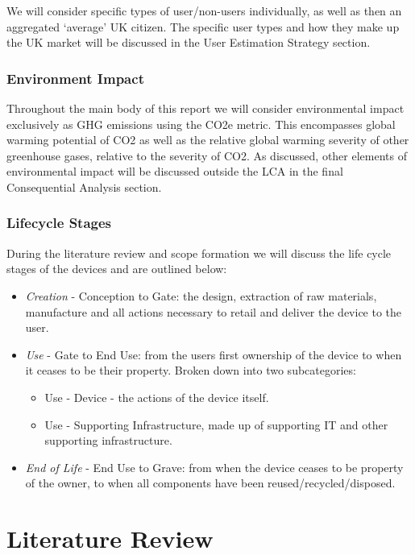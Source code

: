 \documentclass[conference]{IEEEtran}
\begin{document}
We will consider specific types of user/non-users individually, as
well as then an aggregated `average' UK citizen. The specific user
types and how they make up the UK market will be discussed in the User
Estimation Strategy section.

\subsubsection{Environment Impact}

Throughout the main body of this report we will consider environmental
impact exclusively as GHG emissions using the CO2e metric. This
encompasses global warming potential of CO2 as well as the relative
global warming severity of other greenhouse gases, relative to the
severity of CO2. As discussed, other elements of environmental impact
will be discussed outside the LCA in the final Consequential Analysis
section.

\subsubsection{Lifecycle Stages}

During the literature review and scope formation we will discuss the
life cycle stages of the devices and are outlined below:

\begin{itemize}
\item {\emph{Creation}} - Conception to Gate: the design, extraction of raw
  materials, manufacture and all actions necessary to retail and
  deliver the device to the user.
\item {\emph{Use}} - Gate to End Use: from the users first ownership
  of the device to when it ceases to be their property. Broken down
  into two subcategories:
\begin{itemize}
\item Use - Device - the actions of the device itself.
\item Use - Supporting Infrastructure, made up of supporting IT and
  other supporting infrastructure.
\end{itemize}
\item {\emph{End of Life}} - End Use to Grave: from when the device
  ceases to be property of the owner, to when all components have been
  reused/recycled/disposed.
\end{itemize}


\section{Literature Review}
\end{document}
